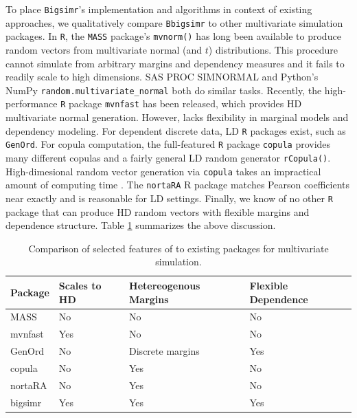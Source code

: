 \documentclass[
]{jss}
\begin{document}
To place \texttt{Bigsimr}'s implementation and algorithms in context of existing approaches, we qualitatively compare \texttt{Bbigsimr} to other multivariate simulation packages. In \texttt{R}, the \texttt{MASS} package's \texttt{mvnorm()} has long been available to produce random vectors from multivariate normal (and \(t\)) distributions. This procedure cannot simulate from arbitrary margins and dependency measures and it fails to readily scale to high dimensions. SAS PROC SIMNORMAL and Python's NumPy \texttt{random.multivariate\_normal} both do similar tasks. Recently, the high-performance \texttt{R} package \texttt{mvnfast} \citep{Fasiolo2016} has been released, which provides HD multivariate normal generation. However, lacks flexibility in marginal models and dependency modeling. For dependent discrete data, LD \texttt{R} packages exist, such as \texttt{GenOrd}. For copula computation, the full-featured \texttt{R} package \texttt{copula} provides many different copulas and a fairly general LD random generator \texttt{rCopula()}. High-dimesional random vector generation via \texttt{copula} takes an impractical amount of computing time \citep{Li2019gpu}. The \texttt{nortaRA} R package matches Pearson coefficients near exactly and is reasonable for LD settings. Finally, we know of no other \texttt{R} package that can produce HD random vectors with flexible margins and dependence structure. Table \ref{tab:compare-table} summarizes the above discussion.

\begin{table}[h]
\centering
\caption{\label{tab:compare-table}Comparison of selected features of  to existing packages for multivariate simulation.}
\begin{tabular}{@{}llll@{}}
Package & Scales to HD & Hetereogenous Margins & Flexible Dependence \\ \midrule
MASS      & No           & No                    & No                  \\
mvnfast   & Yes          & No                    & No                  \\
GenOrd    & No           & Discrete margins      & Yes                 \\
copula    & No           & Yes                   & No                  \\
nortaRA   & No           & Yes                   & No                  \\
bigsimr   & Yes          & Yes                   & Yes                
\end{tabular}
\end{table}
\end{document}

